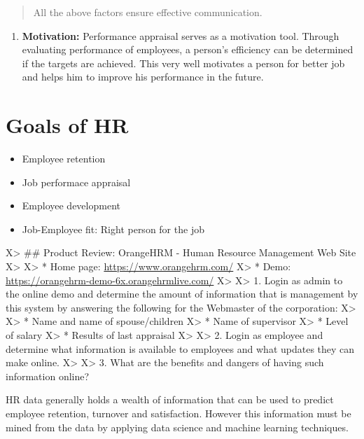 \documentclass[]{book}
\providecommand{\tightlist}{%
  \setlength{\itemsep}{0pt}\setlength{\parskip}{0pt}}
\begin{document}
\begin{quote}
All the above factors ensure effective communication.
\end{quote}

\begin{enumerate}
\def\labelenumi{\arabic{enumi}.}
\setcounter{enumi}{5}
\tightlist
\item
  \textbf{Motivation:} Performance appraisal serves as a motivation tool. Through evaluating performance of employees, a person's efficiency can be determined if the targets are achieved. This very well motivates a person for better job and helps him to improve his performance in the future.
\end{enumerate}

\hypertarget{goals-of-hr}{%
\section{Goals of HR}\label{goals-of-hr}}

\begin{itemize}
\tightlist
\item
  Employee retention
\item
  Job performace appraisal
\item
  Employee development
\item
  Job-Employee fit: Right person for the job
\end{itemize}

X\textgreater{} \#\# Product Review: OrangeHRM - Human Resource Management Web Site
X\textgreater{}
X\textgreater{} * Home page: \url{https://www.orangehrm.com/}
X\textgreater{} * Demo: \url{https://orangehrm-demo-6x.orangehrmlive.com/}
X\textgreater{}
X\textgreater{} 1. Login as admin to the online demo and determine the amount of information that is management by this system by answering the following for the Webmaster of the corporation:
X\textgreater{}
X\textgreater{} * Name and name of spouse/children
X\textgreater{} * Name of supervisor
X\textgreater{} * Level of salary
X\textgreater{} * Results of last appraisal
X\textgreater{}
X\textgreater{} 2. Login as employee and determine what information is available to employees and what updates they can make online.
X\textgreater{}
X\textgreater{} 3. What are the benefits and dangers of having such information online?

HR data generally holds a wealth of information that can be used to predict employee retention, turnover and satisfaction. However this information must be mined from the data by applying data science and machine learning techniques.
\end{document}
